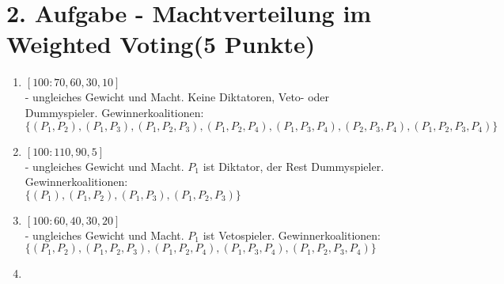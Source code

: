 \documentclass[a4paper, 11pt]{article}
\begin{document}
\section*{2. Aufgabe - Machtverteilung im Weighted Voting\hfill {\small (5 Punkte)}}
\begin{enumerate}

\item 
$[100: 70, 60, 30, 10]$\\
- ungleiches Gewicht und Macht. Keine Diktatoren, Veto- oder Dummyspieler. Gewinnerkoalitionen:\\
$\{(P_1,P_2), (P_1,P_3), (P_1,P_2,P_3), (P_1,P_2,P_4), (P_1,P_3,P_4), (P_2,P_3,P_4), (P_1,P_2,P_3,P_4)\}$

\item$[100: 110, 90, 5]$\\
- ungleiches Gewicht und Macht. $P_1$ ist Diktator, der Rest Dummyspieler. Gewinnerkoalitionen:\\
$\{(P_1), (P_1,P_2), (P_1,P_3), (P_1,P_2,P_3)\}$

\item
$[100: 60, 40, 30, 20]$\\
- ungleiches Gewicht und Macht. $P_1$ ist Vetospieler. Gewinnerkoalitionen:\\
$\{(P_1,P_2), (P_1,P_2,P_3), (P_1,P_2,P_4), (P_1,P_3,P_4), (P_1,P_2,P_3,P_4)\}$
\item
\end{enumerate}
\end{document}
